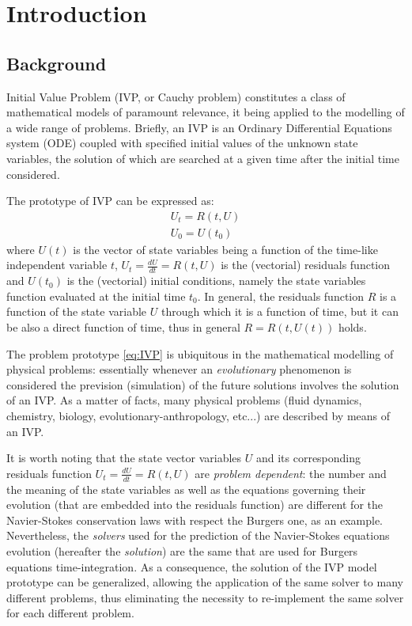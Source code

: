 \documentclass[pdftex,preprint,3p,times,numbers]{elsarticle}
\begin{document}
\section{Introduction}\label{sec:introduction}
\subsection{Background}

Initial Value Problem (IVP, or Cauchy problem) constitutes a class of mathematical models of paramount relevance, it being applied to the modelling of a wide range of problems. Briefly, an IVP is an Ordinary Differential Equations system (ODE) coupled with specified initial values of the unknown state variables, the solution of which are searched at a given time after the initial time considered.

The prototype of IVP can be expressed as:
\begin{equation}
  \begin{matrix}
  U_t = R(t,U) \\
  U_0 = U(t_0)
  \end{matrix}
\label{eq:IVP}
\end{equation}
where $U(t)$ is the vector of state variables being a function of the time-like independent variable $t$, $U_t = \frac{dU}{dt} = R(t,U)$ is the (vectorial) residuals function and $U(t_0)$ is the (vectorial) initial conditions, namely the state variables function evaluated at the initial time $t_0$. In general, the residuals function $R$ is a function of the state variable $U$ through which it is a function of time, but it can be also a direct function of time, thus in general $R=R(t,U(t))$ holds.

The problem prototype \ref{eq:IVP} is ubiquitous in the mathematical modelling of physical problems: essentially whenever an \emph{evolutionary} phenomenon is considered the prevision (simulation) of the future solutions involves the solution of an IVP. As a matter of facts, many physical problems (fluid dynamics, chemistry, biology, evolutionary-anthropology, etc...) are described by means of an IVP.

It is worth noting that the state vector variables $U$ and its corresponding residuals function $U_t = \frac{dU}{dt} = R(t,U)$ are \emph{problem dependent}: the number and the meaning of the state variables as well as the equations governing their evolution (that are embedded into the residuals function) are different for the Navier-Stokes conservation laws with respect the Burgers one, as an example. Nevertheless, the \emph{solvers} used for the prediction of the Navier-Stokes equations evolution (hereafter the \emph{solution}) are the same that are used for Burgers equations time-integration. As a consequence, the solution of the IVP model prototype can be generalized, allowing the application of the same solver to many different problems, thus eliminating the necessity to re-implement the same solver for each different problem.
\end{document}
